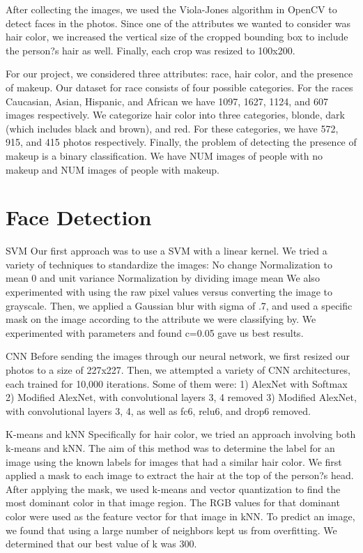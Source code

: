 \documentclass[letterpaper,10pt, twocolumn]{article}
\begin{document}
After collecting the images, we used the Viola-Jones algorithm in OpenCV to detect faces in the photos. Since one of the attributes we wanted to consider was hair color, we increased the vertical size of the cropped bounding box to include the person?s hair as well. Finally, each crop was resized to 100x200.

For our project, we considered three attributes: race, hair color, and the presence of makeup. 
Our dataset for race consists of four possible categories. For the races Caucasian, Asian, Hispanic, and African we have 1097, 1627, 1124, and 607 images respectively. 
We categorize hair color into three categories, blonde, dark (which includes black and brown), and red. For these categories, we have 572, 915, and 415 photos respectively.
Finally, the problem of detecting the presence of makeup is a binary classification. We have NUM images of people with no makeup and NUM images of people with makeup.



\section{Face Detection}
SVM
Our first approach was to use a SVM with a linear kernel. We tried a variety of techniques to standardize the images:
No change
Normalization to mean 0 and unit variance
Normalization by dividing image mean
We also experimented with using the raw pixel values versus converting the image to grayscale. Then, we applied a Gaussian blur with sigma of .7, and used a specific mask on the image according to the attribute we were classifying by. We experimented with parameters and found c=0.05 gave us best results. 

CNN
Before sending the images through our neural network, we first resized our photos to a size of 227x227.
Then, we attempted a variety of CNN architectures, each trained for 10,000 iterations. Some of them were:
1) AlexNet with Softmax
2) Modified AlexNet, with convolutional layers 3, 4 removed
3) Modified AlexNet, with convolutional layers 3, 4, as well as fc6, relu6, and drop6 removed.

K-means and kNN
Specifically for hair color, we tried an approach involving both k-means and kNN. The aim of this method was to determine the label for an image using the known labels for images that had a similar hair color. We first applied a mask to each image to extract the hair at the top of the person?s head. After applying the mask, we used k-means and vector quantization to find the most dominant color in that image region. The RGB values for that dominant color were used as the feature vector for that image in kNN. To predict an image, we found that using a large number of neighbors kept us from overfitting. We determined that our best value of k was 300.
\end{document}
